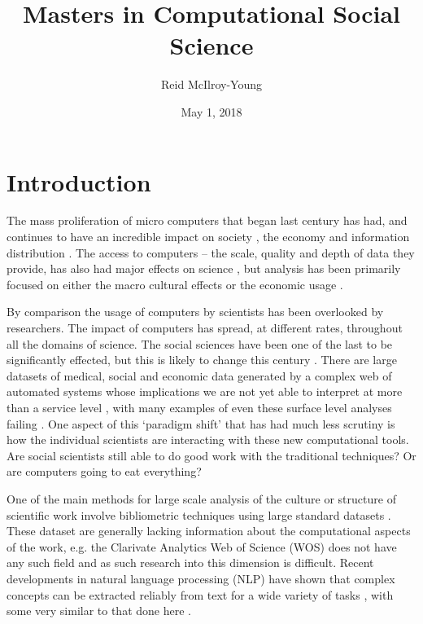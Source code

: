 \documentclass[12pt, a4paper]{article}
\author{Reid McIlroy-Young}
\title{Masters in Computational Social Science}
\date{May 1, 2018}
\begin{document}
\maketitle
\tableofcontents
\newpage
\listoffigures
\listoftables
\newpage
\doublespacing
\setcounter{page}{1}


\section{Introduction}

The mass proliferation of micro computers that began last century has had, and continues to have an incredible impact on society \citep{weizenbaum1972impact}, the economy \citep{gordon2000does} and information distribution \citep{berners2010world}. The access to computers -- the scale, quality and depth of data they provide, has also had major effects on science \citep{lazer2009life}, but analysis has been primarily focused on either the macro cultural effects \citep{pfaffenberger1988social} or the economic usage \citep{landauer1995trouble}.

By comparison the usage of computers by scientists has been overlooked by researchers. The impact of computers has spread, at different rates, throughout all the domains of science. The social sciences have been one of the last to be significantly effected, but this is likely to change this century \citep{watts2007twenty}. There are large datasets of medical, social and economic data generated by a complex web of automated systems whose implications we are not yet able to interpret at more than a service level \citep{kossinets2006empirical} \citep{back2010emotional}, with many examples of even these surface level analyses failing \citep{lazer2014parable} \citep{kramer2014experimental}. One aspect of this `paradigm shift' that has had much less scrutiny is how the individual scientists are interacting with these new computational tools. Are social scientists still able to do good work with the traditional techniques? Or are computers going to eat everything?

One of the main methods for large scale analysis of the culture or structure of scientific work involve bibliometric techniques \citep{de2009bibliometrics} using large standard datasets \citep[e.g.][]{Boyack2005, borner2010atlas, borner2015atlas, sugimoto2013global, shi2015weaving, evans_meta, skupin2013visualizing}. These dataset are generally lacking information about the computational aspects of the work, e.g. the  Clarivate Analytics Web of Science (WOS) does not have any such field \citep{mkdocs} and as such research into this dimension is difficult. Recent developments in natural language processing (NLP) have shown that complex concepts can be extracted reliably from text for a wide variety of tasks \citep{evans2016machine}, with some very similar to that done here \citep{foster2015tradition}.
\end{document}
